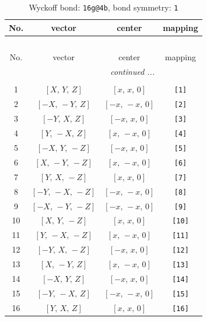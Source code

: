 \documentclass[fleqn,8pt]{jsarticle}
\begin{document}
\begin{longtable}{cccc}
\caption{Wyckoff bond: {\tt 16g@4b}, bond symmetry: {\tt 1}}
 \\
 \hline \hline
No. & vector & center & mapping \\ \hline \endfirsthead

\multicolumn{3}{l}{\tablename\ \thetable{}} \\
 \hline \hline
No. & vector & center & mapping \\ \hline \endhead

 \hline \hline
\multicolumn{3}{r}{\footnotesize\it continued ...} \\ \endfoot

 \hline \hline
\multicolumn{3}{r}{} \\ \endlastfoot

1 & $\left[ X,\, Y,\, Z \right]$ & $\left[ x,\, x,\, 0 \right]$ & {\tt [1]} \\ \hline
2 & $\left[ - X,\, - Y,\, Z \right]$ & $\left[ - x,\, - x,\, 0 \right]$ & {\tt [2]} \\ \hline
3 & $\left[ - Y,\, X,\, Z \right]$ & $\left[ - x,\, x,\, 0 \right]$ & {\tt [3]} \\ \hline
4 & $\left[ Y,\, - X,\, Z \right]$ & $\left[ x,\, - x,\, 0 \right]$ & {\tt [4]} \\ \hline
5 & $\left[ - X,\, Y,\, - Z \right]$ & $\left[ - x,\, x,\, 0 \right]$ & {\tt [5]} \\ \hline
6 & $\left[ X,\, - Y,\, - Z \right]$ & $\left[ x,\, - x,\, 0 \right]$ & {\tt [6]} \\ \hline
7 & $\left[ Y,\, X,\, - Z \right]$ & $\left[ x,\, x,\, 0 \right]$ & {\tt [7]} \\ \hline
8 & $\left[ - Y,\, - X,\, - Z \right]$ & $\left[ - x,\, - x,\, 0 \right]$ & {\tt [8]} \\ \hline
9 & $\left[ - X,\, - Y,\, - Z \right]$ & $\left[ - x,\, - x,\, 0 \right]$ & {\tt [9]} \\ \hline
10 & $\left[ X,\, Y,\, - Z \right]$ & $\left[ x,\, x,\, 0 \right]$ & {\tt [10]} \\ \hline
11 & $\left[ Y,\, - X,\, - Z \right]$ & $\left[ x,\, - x,\, 0 \right]$ & {\tt [11]} \\ \hline
12 & $\left[ - Y,\, X,\, - Z \right]$ & $\left[ - x,\, x,\, 0 \right]$ & {\tt [12]} \\ \hline
13 & $\left[ X,\, - Y,\, Z \right]$ & $\left[ x,\, - x,\, 0 \right]$ & {\tt [13]} \\ \hline
14 & $\left[ - X,\, Y,\, Z \right]$ & $\left[ - x,\, x,\, 0 \right]$ & {\tt [14]} \\ \hline
15 & $\left[ - Y,\, - X,\, Z \right]$ & $\left[ - x,\, - x,\, 0 \right]$ & {\tt [15]} \\ \hline
16 & $\left[ Y,\, X,\, Z \right]$ & $\left[ x,\, x,\, 0 \right]$ & {\tt [16]} \\
\end{longtable}
\end{document}
